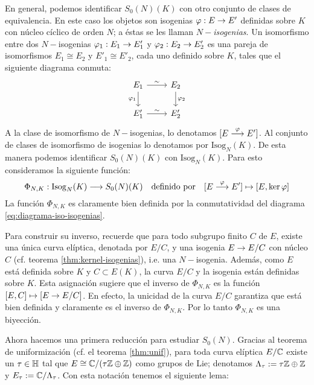 \documentclass[../../tesis_maestria]{subfiles}
\begin{document}
\begin{nota}
En general, podemos identificar $S_0(N)(K)$ con otro conjunto de clases de equivalencia. En este caso los objetos son isogenias $\varphi:E\rightarrow E'$ definidas sobre $K$ con núcleo cíclico de orden $N$; a éstas se les llaman $N-$\emph{isogenias}. Un isomorfismo entre dos $N-$isogenias $\varphi_1:E_1\rightarrow E'_1$ y $\varphi_2:E_2\rightarrow E'_2$ es una pareja de isomorfismos $E_1\cong E_2$ y $E'_1\cong E'_2$, cada uno definido sobre $K$, tales que el siguiente diagrama conmuta:
\begin{equation}\label{eq:diagrama-iso-isogenias}
	\begin{tikzcd}
		E_1 \arrow[d,"\varphi_1"'] \arrow[r,"\sim"] & E_2 \arrow[d,"\varphi_2"]\\
		E'_1 \arrow[r,"\sim"] & E'_2
	\end{tikzcd}
\end{equation}
A la clase de isomorfismo de $N-$isogenias, lo denotamos $[E\overset{\varphi}{\longrightarrow} E']$. Al conjunto de clases de isomorfismo de isogenias lo denotamos por $\mathrm{Isog}_N(K)$. De esta manera podemos identificar $S_0(N)(K)$ con $\mathrm{Isog}_N(K)$. Para esto consideramos la siguiente función:
\begin{equation}\label{def:phi-N-K}
	\Phi_{N,K}:\mathrm{Isog}_N(K)\longrightarrow S_0(N)(K)\quad\text{definido por}\quad [E\overset{\varphi}{\longrightarrow} E']\mapsto [E,\ker\varphi]
\end{equation}
La función $\Phi_{N,K}$ es claramente bien definida por la conmutatividad del diagrama \eqref{eq:diagrama-iso-isogenias}.

Para construir su inverso, recuerde que para todo subgrupo finito $C$ de $E$, existe una única curva elíptica, denotada por $E/C$, y una isogenia $E\rightarrow E/C$ con núcleo $C$ (cf. teorema \ref{thm:kernel-isogenias}), i.e. una $N-$isogenia. Además, como $E$ está definida sobre $K$ y $C\subset E(K)$, la curva $E/C$ y la isogenia están definidas sobre $K$. Esta asignación sugiere que el inverso de $\Phi_{N,K}$ es la función $[E,C]\mapsto[E\rightarrow E/C]$. En efecto, la unicidad de la curva $E/C$ garantiza que está bien definida y claramente es el inverso de $\Phi_{N,K}$. Por lo tanto $\Phi_{N,K}$ es una biyección.
\end{nota}

Ahora hacemos una primera reducción para estudiar $S_0(N)$. Gracias al teorema de uniformización (cf. el teorema \ref{thm:unif}), para toda curva elíptica $E/\mathbb{C}$ existe un $\tau\in\mathbb{H}$ tal que $E\cong \mathbb{C}/(\tau\mathbb{Z}\oplus\mathbb{Z})$ como grupos de Lie; denotamos $\Lambda_\tau:=\tau\mathbb{Z}\oplus\mathbb{Z}$ y  $E_\tau:=\mathbb{C}/\Lambda_\tau$. Con esta notación tenemos el siguiente lema:
\end{document}
